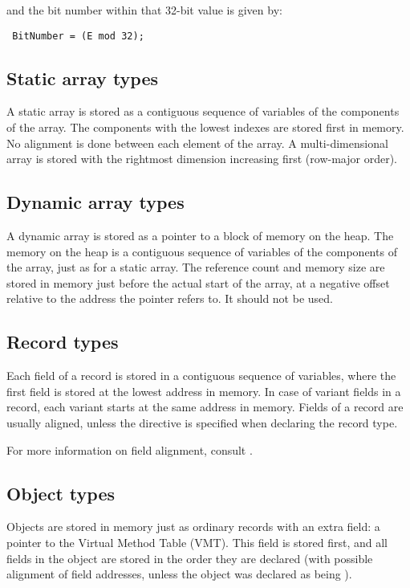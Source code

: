 and the bit number within that 32-bit value is given by:
\begin{verbatim}
 BitNumber = (E mod 32);
\end{verbatim}

\subsection{Static array types}

A static array is stored as a contiguous sequence of variables
of the components of the array. The components with the
lowest indexes are stored first in memory. No alignment
is done between each element of the array. A multi-dimensional
array is stored with the rightmost dimension increasing first
(row-major order).

\subsection{Dynamic array types}

A dynamic array is stored as a pointer to a block of memory on the heap.
The memory on the heap is a contiguous sequence of variables
of the components of the array, just as for a static array. The reference
count and memory size are stored in memory just before the actual start of
the array, at a negative offset relative to the address the pointer refers
to. It should not be used.

\subsection{Record types}

Each field of a record is stored in a contiguous sequence
of variables, where the first field is stored at the
lowest address in memory. In case of variant fields in
a record, each variant starts at the same address in
memory. Fields of a record are usually aligned, unless
the  directive is specified when declaring
the record type. 

For more information on field alignment, consult .

\subsection{Object types}
\label{subse:ObjMemory}

Objects are stored in memory just as ordinary records with an extra field:
a pointer to the Virtual Method Table (VMT). This field is stored first, and
all fields in the object are stored in the order they are declared (with possible
alignment of field addresses, unless the object was declared as being ).

